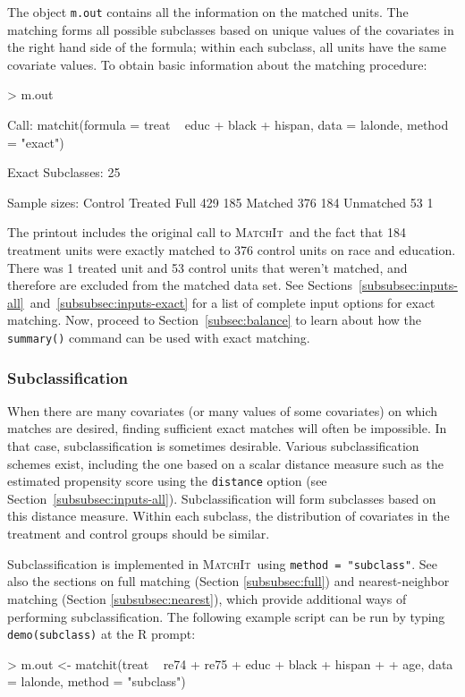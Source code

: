\documentclass[oneside,letterpaper,titlepage]{article}
\newcommand{\MatchIt}{\textsc{MatchIt}}
\begin{document}
The object \texttt{m.out} contains all the information on the matched
units.  The matching forms all possible subclasses based on unique
values of the covariates in the right hand side of the formula; within
each subclass, all units have the same covariate values.  To obtain
basic information about the matching procedure:
\begin{Schunk}
\begin{Sinput}
> m.out
\end{Sinput}
\begin{Soutput}
Call: 
matchit(formula = treat ~ educ + black + hispan, data = lalonde, 
    method = "exact")



Exact Subclasses: 25

Sample sizes:
          Control Treated
Full          429     185
Matched       376     184
Unmatched      53       1
\end{Soutput}
\end{Schunk}

The printout includes the original call to \MatchIt\ and the fact that
184
treatment units were exactly matched to 376 
control units on race
and education. There was 1
treated unit and 53
control units that weren't matched,
and therefore are excluded from the matched data set. See
Sections~\ref{subsubsec:inputs-all}~and~\ref{subsubsec:inputs-exact}
for a list of complete input options for exact matching.  Now, proceed
to Section~\ref{subsec:balance} to learn about how the {\tt summary()}
command can be used with exact matching.

\subsubsection{Subclassification}
\label{subsubsec:subclass}

When there are many covariates (or many values of some covariates) on
which matches are desired, finding sufficient exact matches will often
be impossible.  In that case, subclassification is sometimes
desirable. Various subclassification schemes exist, including the one
based on a scalar distance measure such as the estimated propensity
score using the \texttt{distance} option (see
Section~\ref{subsubsec:inputs-all}).  Subclassification will form
subclasses based on this distance measure.  Within each subclass, the
distribution of covariates in the treatment and control groups should
be similar.

Subclassification is implemented in \MatchIt\ using \texttt{method =
  "subclass"}.  See also the sections on full matching (Section
\ref{subsubsec:full}) and nearest-neighbor matching (Section
\ref{subsubsec:nearest}), which provide additional ways of performing
subclassification.  The following example script can be run by typing
{\tt demo(subclass)} at the R prompt:
\begin{Schunk}
\begin{Sinput}
> m.out <- matchit(treat ~ re74 + re75 + educ + black + hispan + 
+     age, data = lalonde, method = "subclass")
\end{Sinput}
\end{Schunk}
\end{document}

